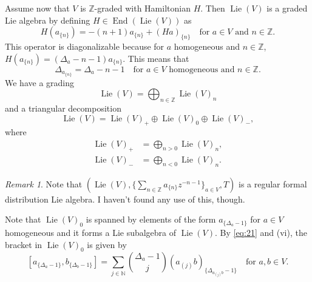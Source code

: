 \documentclass[a4paper, 12pt, reqno]{amsart}
\theoremstyle{remark}
\newtheorem{remark}[theorem]{Remark}
\numberwithin{equation}{subsection}
\DeclareMathOperator{\End}{End}
\DeclareMathOperator{\Lie}{Lie}
\begin{document}
Assume now that $V$ is $\mathbb{Z}$-graded with Hamiltonian $H$.
Then $\Lie(V)$ is a graded Lie algebra by defining $H \in \End(\Lie(V))$ as
\begin{equation*}
  H(a_{\{n\}}) = -(n + 1)a_{\{n\}} + (Ha)_{\{n\}} \quad \text{for }a \in V\text{ and }n \in \mathbb{Z}.
\end{equation*}
This operator is diagonalizable because for $a$ homogeneous and $n \in \mathbb{Z}$, $H(a_{\{n\}}) = (\Delta_a - n - 1)a_{\{n\}}$.
This means that
\begin{equation*}
  \Delta_{a_{\{n\}}} = \Delta_a - n - 1\quad \text{for }a \in V\text{ homogeneous and }n \in \mathbb{Z}.
\end{equation*}
We have a grading
\begin{equation*}
  \Lie(V) = \bigoplus_{n \in \mathbb{Z}}\Lie(V)_n
\end{equation*}
and a triangular decomposition
\begin{equation*}
  \Lie(V) = \Lie(V)_+ \oplus \Lie(V)_0 \oplus \Lie(V)_-,
\end{equation*}
where
\begin{align*}
  \Lie(V)_+ &= \bigoplus_{n > 0}\Lie(V)_n, \\
  \Lie(V)_- &= \bigoplus_{n < 0}\Lie(V)_n.
\end{align*}

\begin{remark}
  \label{rmk:25}
  Note that $(\Lie(V), \{\sum_{n \in \mathbb{Z}}a_{\{n\}}z^{-n - 1}\}_{a \in V}, T)$ is a regular formal distribution Lie algebra.
  I haven't found any use of this, though.
\end{remark}

Note that $\Lie(V)_0$ is spanned by elements of the form $a_{\{\Delta_a - 1\}}$ for $a \in V$ homogeneous and it forms a Lie subalgebra of $\Lie(V)$.
By \eqref{eq:21} and (vi), the bracket in $\Lie(V)_0$ is given by
\begin{equation}
  \label{eq:22}
  [a_{\{\Delta_a - 1\}}, b_{\{\Delta_b - 1\}}] = \sum_{j \in \mathbb{N}}\binom{\Delta_a - 1}{j}(a_{(j)}b)_{\{\Delta_{a_{(j)}b} - 1\}}\quad \text{for }a, b \in V.
\end{equation}
\end{document}
